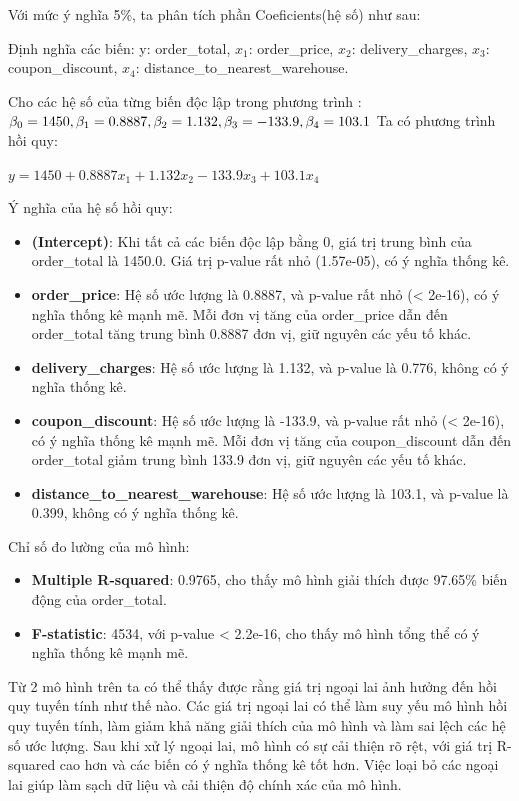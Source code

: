 Với mức ý nghĩa 5\%, ta phân tích phần Coeficients(hệ số) như sau:

Định nghĩa các biến:  y: order\_total, $x_1$: order\_price, $x_2$: delivery\_charges, $x_3$: coupon\_discount, $x_4$: distance\_to\_nearest\_warehouse.

Cho các hệ số của từng biến độc lập trong phương trình : $\beta_0= 1450, \beta_1= 0.8887, \\\beta_2= 1.132, \beta_3= -133.9, \beta_4= 103.1$ Ta có phương trình hồi quy: 

 \hspace{25mm}$y= 1450 + 0.8887x_1 + 1.132x_2 - 133.9x_3 + 103.1x_4$

Ý nghĩa của hệ số hồi quy:
\begin{itemize}
\item\textbf{(Intercept)}: Khi tất cả các biến độc lập bằng 0, giá trị trung bình của order\_total là 1450.0. Giá trị p-value rất nhỏ (1.57e-05), có ý nghĩa thống kê.
\item\textbf{order\_price}: Hệ số ước lượng là 0.8887, và p-value rất nhỏ (< 2e-16), có ý nghĩa thống kê mạnh mẽ. Mỗi đơn vị tăng của order\_price dẫn đến order\_total tăng trung bình 0.8887 đơn vị, giữ nguyên các yếu tố khác.\\
\item\textbf{delivery\_charges}: Hệ số ước lượng là 1.132, và p-value là 0.776, không có ý nghĩa thống kê.
\item\textbf{coupon\_discount}: Hệ số ước lượng là -133.9, và p-value rất nhỏ (< 2e-16), có ý nghĩa thống kê mạnh mẽ. Mỗi đơn vị tăng của coupon\_discount dẫn đến order\_total giảm trung bình 133.9 đơn vị, giữ nguyên các yếu tố khác.
\item\textbf{distance\_to\_nearest\_warehouse}: Hệ số ước lượng là 103.1, và p-value là 0.399, không có ý nghĩa thống kê.
\end{itemize}

Chỉ số đo lường của mô hình:

\begin{itemize}
\item\textbf{Multiple R-squared}: 0.9765, cho thấy mô hình giải thích được 97.65\% biến động của order\_total.
\item\textbf{F-statistic}: 4534, với p-value < 2.2e-16, cho thấy mô hình tổng thể có ý nghĩa thống kê mạnh mẽ.
\end{itemize}

Từ 2 mô hình trên ta có thể thấy được rằng giá trị ngoại lai ảnh hưởng đến hồi quy tuyến tính như thế nào. Các giá trị ngoại lai có thể làm suy yếu mô hình hồi quy tuyến tính, làm giảm khả năng giải thích của mô hình và làm sai lệch các hệ số ước lượng. Sau khi xử lý ngoại lai, mô hình có sự cải thiện rõ rệt, với giá trị R-squared cao hơn và các biến có ý nghĩa thống kê tốt hơn. Việc loại bỏ các ngoại lai giúp làm sạch dữ liệu và cải thiện độ chính xác của mô hình.

